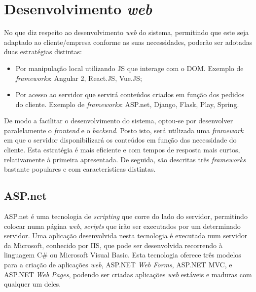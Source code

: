 

\section{Desenvolvimento \textit{web}}

No que diz respeito ao desenvolvimento \textit{web} do sistema, permitindo que este seja adaptado ao cliente/empresa conforme as suas necessidades, poderão ser adotadas duas estratégias distintas: 

\begin{itemize}
	\item Por manipulação local utilizando \ac{JS} que interage com o \ac{DOM}. Exemplo de \textit{frameworks}: Angular 2, React.JS, Vue.JS; 
	
	\item Por acesso ao servidor que servirá conteúdos criados em função dos pedidos do cliente. Exemplo de \textit{frameworks}: ASP.net, Django, Flask, Play, Spring. 
	
\end{itemize}


De modo a facilitar o desenvolvimento do sistema, optou-se por desenvolver paralelamente o \textit{frontend} e o \textit{backend}. Posto isto, será utilizada uma \textit{framework} em que o servidor disponibilizará os conteúdos em função das necessidade do cliente. Esta estratégia é mais eficiente e com tempos de resposta mais curtos, relativamente à primeira apresentada. De seguida, são descritas três \textit{frameworks} bastante populares e com características distintas. 

\subsection{ASP.net}

ASP.net é uma tecnologia de \textit{scripting} que corre do lado do servidor, permitindo colocar numa página \textit{web}, \textit{scripts} que irão ser executados por um determinado servidor. Uma aplicação desenvolvida nesta tecnologia é executada num servidor da Microsoft, conhecido por \ac{IIS}, que pode ser desenvolvida recorrendo à linguagem C\# ou Microsoft Visual Basic. Esta tecnologia oferece três modelos para a criação de aplicações \textit{web}, ASP.NET \textit{Web Forms}, ASP.NET \ac{MVC}, e ASP.NET \textit{Web Pages}, podendo ser criadas aplicações \textit{web} estáveis e maduras com qualquer um deles\cite{Microsoft2016}. 


